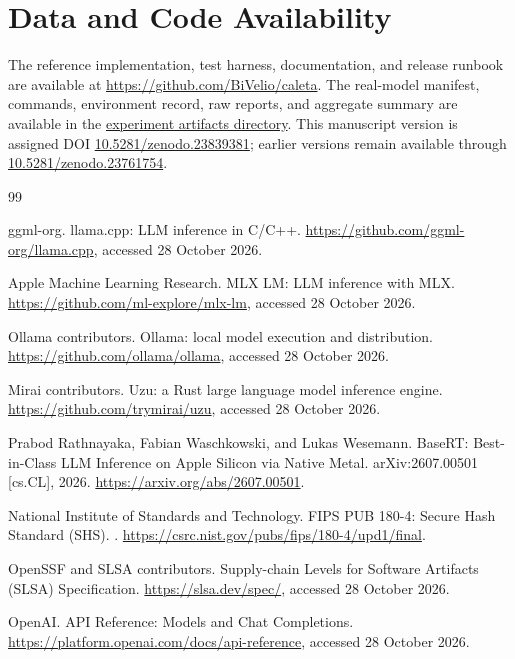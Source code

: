 \documentclass[11pt,a4paper]{article}
\newcommand{\artifact}[2]{\href{https://github.com/BiVelio/caleta/blob/evidence-v1.1/#1}{#2}}
\begin{document}
\section*{Data and Code Availability}

The reference implementation, test harness, documentation, and release runbook are available at \url{https://github.com/BiVelio/caleta}. The real-model manifest, commands, environment record, raw reports, and aggregate summary are available in the \artifact{experiments/real-gguf-qwen2.5-0.5b/README.md}{experiment artifacts directory}. This manuscript version is assigned DOI \href{https://doi.org/10.5281/zenodo.23839381}{10.5281/zenodo.23839381}; earlier versions remain available through \href{https://doi.org/10.5281/zenodo.23761754}{10.5281/zenodo.23761754}.

\raggedright
\begin{thebibliography}{99}

ggml-org.
\newblock llama.cpp: LLM inference in C/C++.
\newblock \url{https://github.com/ggml-org/llama.cpp}, accessed 28 October 2026.

Apple Machine Learning Research.
\newblock MLX LM: LLM inference with MLX.
\newblock \url{https://github.com/ml-explore/mlx-lm}, accessed 28 October 2026.

Ollama contributors.
\newblock Ollama: local model execution and distribution.
\newblock \url{https://github.com/ollama/ollama}, accessed 28 October 2026.

Mirai contributors.
\newblock Uzu: a Rust large language model inference engine.
\newblock \url{https://github.com/trymirai/uzu}, accessed 28 October 2026.

Prabod Rathnayaka, Fabian Waschkowski, and Lukas Wesemann.
\newblock BaseRT: Best-in-Class LLM Inference on Apple Silicon via Native Metal.
\newblock arXiv:2607.00501 [cs.CL], 2026.
\newblock \url{https://arxiv.org/abs/2607.00501}.

National Institute of Standards and Technology.
\newblock FIPS PUB 180-4: Secure Hash Standard (SHS).
.
\newblock \url{https://csrc.nist.gov/pubs/fips/180-4/upd1/final}.

OpenSSF and SLSA contributors.
\newblock Supply-chain Levels for Software Artifacts (SLSA) Specification.
\newblock \url{https://slsa.dev/spec/}, accessed 28 October 2026.

OpenAI.
\newblock API Reference: Models and Chat Completions.
\newblock \url{https://platform.openai.com/docs/api-reference}, accessed 28 October 2026.


\end{thebibliography}
\end{document}

